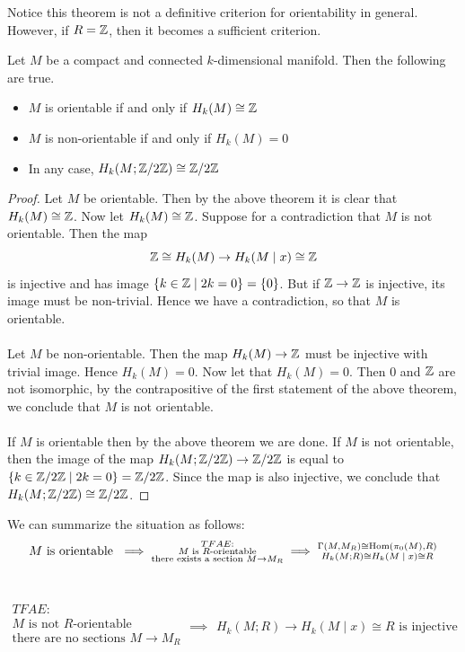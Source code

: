 \documentclass[a4paper]{article}
\begin{document}
Notice this theorem is not a definitive criterion for orientability in general. However, if $R=\mathbb{Z}$, then it becomes a sufficient criterion. 

\begin{crl}{}{} Let $M$ be a compact and connected $k$-dimensional manifold. Then the following are true. 
\begin{itemize}
\item $M$ is orientable if and only if $H_k(M)\cong\mathbb{Z}$
\item $M$ is non-orientable if and only if $H_k(M)=0$
\item In any case, $H_k(M;\mathbb{Z}/2\mathbb{Z})\cong\mathbb{Z}/2\mathbb{Z}$
\end{itemize} \tcbline
\begin{proof}
Let $M$ be orientable. Then by the above theorem it is clear that $H_k(M)\cong\mathbb{Z}$. Now let $H_k(M)\cong\mathbb{Z}$. Suppose for a contradiction that $M$ is not orientable. Then the map $$\mathbb{Z}\cong H_k(M)\to H_k(M\;|\;x)\cong\mathbb{Z}$$ is injective and has image $\{k\in\mathbb{Z}\;|\;2k=0\}=\{0\}$. But if $\mathbb{Z}\to\mathbb{Z}$ is injective, its image must be non-trivial. Hence we have a contradiction, so that $M$ is orientable. \\~\\

Let $M$ be non-orientable. Then the map $H_k(M)\to\mathbb{Z}$ must be injective with trivial image. Hence $H_k(M)=0$. Now let that $H_k(M)=0$. Then $0$ and $\mathbb{Z}$ are not isomorphic, by the contrapositive of the first statement of the above theorem, we conclude that $M$ is not orientable. \\~\\

If $M$ is orientable then by the above theorem we are done. If $M$ is not orientable, then the image of the map $H_k(M;\mathbb{Z}/2\mathbb{Z})\to\mathbb{Z}/2\mathbb{Z}$ is equal to $\{k\in\mathbb{Z}/2\mathbb{Z}\;|\;2k=0\}=\mathbb{Z}/2\mathbb{Z}$. Since the map is also injective, we conclude that $H_k(M;\mathbb{Z}/2\mathbb{Z})\cong\mathbb{Z}/2\mathbb{Z}$. 
\end{proof}
\end{crl}

We can summarize the situation as follows: $$M\text{ is orientable }\implies\substack{TFAE:\\M\text{ is }R\text{-orientable}\\\text{there exists a section }M\to M_R\\}\implies\substack{\Gamma(M,M_R)\cong\operatorname{Hom}(\pi_0(M),R)\\H_k(M;R)\cong H_k(M\;|\;x)\cong R}$$~

$$\substack{TFAE:\\M\text{ is not }R\text{-orientable}\\\text{there are no sections }M\to M_R\\}\implies\substack{H_k(M;R)\longrightarrow H_k(M\;|\;x)\cong R\text{ is injective}}$$
\end{document}
